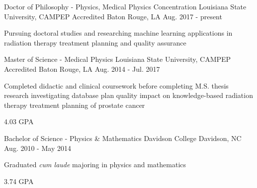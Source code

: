 

\begin{cventries}

  \cventry
    {Doctor of Philosophy - Physics, Medical Physics Concentration} %
    {Louisiana State University, CAMPEP Accredited} %
    {Baton Rouge, LA} %
    {Aug. 2017 - present} %
    {
    \begin{cvitems} %
      \item {Pursuing doctoral studies and researching machine learning applications in radiation therapy treatment planning and quality assurance}
    \end{cvitems}
    }
    {}

  \cventry
    {Master of Science - Medical Physics} %
    {Louisiana State University, CAMPEP Accredited} %
    {Baton Rouge, LA} %
    {Aug. 2014 - Jul. 2017} %
    {
    \begin{cvitems} %
      \item {Completed didactic and clinical coursework before completing M.S. thesis research investigating database plan quality impact on knowledge-based radiation therapy treatment planning of prostate cancer}
    \end{cvitems}
    }
    {4.03 GPA}

  \cventry
    {Bachelor of Science - Physics \& Mathematics} %
    {Davidson College} %
    {Davidson, NC} %
    {Aug. 2010 - May 2014} %
    {
    \begin{cvitems} %
      \item {Graduated \textit{cum laude} majoring in physics and mathematics}
    \end{cvitems}
    }
    {3.74 GPA}

\end{cventries}
